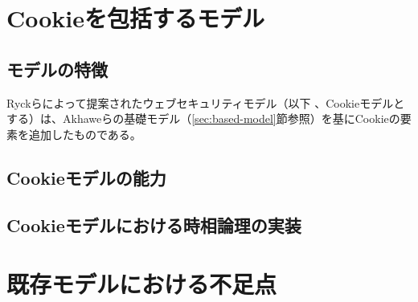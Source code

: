 \documentclass[12pt,a4paper]{jbook}
\begin{document}
\section{Cookieを包括するモデル}
\subsection{モデルの特徴}
Ryckらによって提案されたウェブセキュリティモデル\cite{cookie-model}（以下
、Cookieモデルとする）は、Akhaweらの基礎モデル（\ref{sec:based-model}節参照）を基にCookieの要素を追加したものである。

\subsection{Cookieモデルの能力}
\subsection{Cookieモデルにおける時相論理の実装}

\section{既存モデルにおける不足点}
\end{document}
